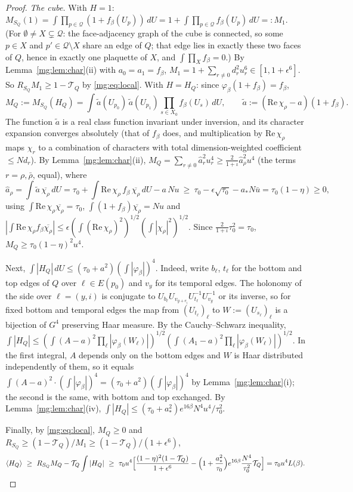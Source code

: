 \documentclass[11pt,a4paper]{article}
\theoremstyle{definition}
\theoremstyle{remark}
\newcommand{\dU}{\,dU}
\begin{document}
\begin{proof}
\emph{The cube.} With $H=1$: $M_{S_Q}(1)=\int\prod_{p\in\mathcal Q}(1+f_\beta(U_p))\dU=1+\int\prod_{p\in\mathcal Q}f_\beta(U_p)\dU=:M_1$. (For
$\emptyset\neq X\subsetneq\mathcal Q$: the face-adjacency graph of the cube is connected, so some $p\in X$ and $p'\in\mathcal Q\setminus X$ share an
edge of $Q$; that edge lies in exactly these two faces of $Q$, hence in exactly one plaquette of $X$, and $\int\prod_Xf_\beta=0$.) By
Lemma~\ref{mg:lem:char}(ii) with $a_0=a_1=f_\beta$, $M_1=1+\sum_{r\ne0}d_r^2u_r^6\in[1,1+\epsilon^6]$. So $R_{S_Q}M_1\ge1-\mathcal T_Q$ by
\eqref{mg:eq:local}. With $H=H_Q$: since $\varphi_\beta(1+f_\beta)=f_\beta$,
\[
M_Q:=M_{S_Q}(H_Q)=\int\tilde a(U_{p_0})\,\tilde a(U_{p_1})\prod_{s\in X_0}f_\beta(U_s)\dU,\qquad\tilde a:=(\mathrm{Re}\,\chi_\rho-a)(1+f_\beta).
\]
The function $\tilde a$ is a real class function invariant under inversion, and its character expansion converges absolutely (that of $f_\beta$
does, and multiplication by $\mathrm{Re}\,\chi_\rho$ maps $\chi_r$ to a combination of characters with total dimension-weighted coefficient
$\le Nd_r$). By Lemma~\ref{mg:lem:char}(ii), $M_Q=\sum_{r\ne0}\hat a_r^2u_r^4\ge\frac2{1+\iota}\hat a_\rho^2u^4$ (the terms $r=\rho,\bar\rho$, equal), where
\[
\hat a_\rho=\int\tilde a\,\overline{\chi_\rho}\dU=\tau_0+\int\mathrm{Re}\,\chi_\rho\,f_\beta\,\overline{\chi_\rho}\dU-a\,Nu\ \ge\ \tau_0-\epsilon\sqrt{\tau_0}-a_*N\bar u=\tau_0(1-\eta)\ge0,
\]
using $\int\mathrm{Re}\,\chi_\rho\overline{\chi_\rho}=\tau_0$, $\int(1+f_\beta)\overline{\chi_\rho}=Nu$ and $|\int\mathrm{Re}\,\chi_\rho f_\beta\overline{\chi_\rho}|\le
\epsilon(\int(\mathrm{Re}\,\chi_\rho)^2)^{1/2}(\int|\chi_\rho|^2)^{1/2}$. Since $\frac2{1+\iota}\tau_0^2=\tau_0$, $M_Q\ge\tau_0(1-\eta)^2u^4$.

Next, $\int|H_Q|\dU\le(\tau_0+a^2)(\int|\varphi_\beta|)^4$. Indeed, write $b_\ell$, $t_\ell$ for the bottom and top edges of $Q$ over
$\ell\in E(p_0)$ and $v_y$ for its temporal edges. The holonomy of the side over $\ell=(y,i)$ is conjugate to $U_{b_\ell}U_{v_{y+e_i}}U_{t_\ell}^{-1}U_{v_y}^{-1}$
or its inverse, so for fixed bottom and temporal edges the map from $(U_{t_\ell})_\ell$ to $W:=(U_{s_\ell})_\ell$ is a bijection of $G^4$ preserving Haar
measure. By the Cauchy--Schwarz inequality, $\int|H_Q|\le(\int(A-a)^2\prod_\ell|\varphi_\beta(W_\ell)|)^{1/2}(\int(A_1-a)^2\prod_\ell|\varphi_\beta(W_\ell)|)^{1/2}$.
In the first integral, $A$ depends only on the bottom edges and $W$ is Haar distributed independently of them, so it equals
$\int(A-a)^2\cdot(\int|\varphi_\beta|)^4=(\tau_0+a^2)(\int|\varphi_\beta|)^4$ by Lemma~\ref{mg:lem:char}(i); the second is the same, with bottom
and top exchanged. By Lemma~\ref{mg:lem:char}(iv), $\int|H_Q|\le(\tau_0+a_*^2)e^{16\beta}N^4u^4/\tau_0^2$.

Finally, by \eqref{mg:eq:local}, $M_Q\ge0$ and $R_{S_Q}\ge(1-\mathcal T_Q)/M_1\ge(1-\mathcal T_Q)/(1+\epsilon^6)$,
\[
\langle H_Q\rangle\ \ge\ R_{S_Q}M_Q-\mathcal T_Q\int|H_Q|\ \ge\ \tau_0u^4\Bigl[\frac{(1-\eta)^2(1-\mathcal T_Q)}{1+\epsilon^6}-\Bigl(1+\frac{a_*^2}{\tau_0}\Bigr)e^{16\beta}\frac{N^4}{\tau_0^2}\mathcal T_Q\Bigr]
=\tau_0u^4L(\beta). \qedhere
\]
\end{proof}
\end{document}
